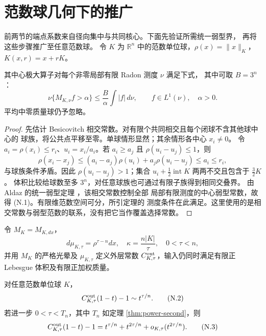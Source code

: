 \section{范数球几何下的推广}\label{sec:norm-geometry}
前两节的端点系数来自径向集中与共同核心。下面先验证所需统一弱型界，
再将这些步骤推广至任意范数球。
令 $K$ 为 $\mathbb R^n$ 中的范数单位球，$\rho(x)=\|x\|_K$，
$K(x,r)=x+rK$。
\begin{lemma}\label{lem:norm-weak}
其中心极大算子对每个非零局部有限 Radon 测度 $\nu$ 满足下式，
其中可取 $B=3^n$：
\[\nu\{M_{K,\nu}f>\alpha\}\le\frac B\alpha\int|f|\,d\nu,
\qquad f\in L^1(\nu),\quad\alpha>0.\tag{N.1}\]
平均中零质量球仍予忽略。
\end{lemma}
\begin{proof}
先估计 Besicovitch 相交常数。对有限个共同相交且每个闭球不含其他球中心的
球族，将公共点平移至零。单球情形显然；其余情形各中心 $x_i\ne0$。
令 $a_i=\rho(x_i)\le r_i$、$u_i=x_i/a_i$。若 $a_i\ge a_j$ 且
$\rho(u_i-u_j)\le1$，则
\[\rho(x_i-x_j)\le(a_i-a_j)\rho(u_i)+a_j\rho(u_i-u_j)\le a_i\le r_i,\]
与球族条件矛盾。因此 $\rho(u_i-u_j)>1$；集合
$u_i+\frac12\operatorname{int}K$ 两两不交且包含于 $\frac32K$。
体积比较给球数至多 $3^n$，对任意球族也可通过有限子族得到相同交叠界。
由 Aldaz 的统一弱型定理 \cite[Theorem 1.2]{Aldaz2020}，该相交常数控制全部
局部有限测度的中心弱型常数，故得 (N.1)。有限维范数空间可分，所引定理的
测度条件在此满足。这里使用的是相交常数与弱型范数的联系，没有把它当作覆盖选择常数。
\end{proof}
令 $M_K=M_{K,dx}$，
\[d\mu_{K,\tau}=\rho^{\tau-n}dx,\quad
\kappa=\frac{n|K|}{\tau},\quad 0<\tau<n,\]
并用 $M_K$ 的严格光晕及 $\mu_{K,\tau}$ 定义外层常数
$C^{\rm out}_{K,\tau}$，输入仍同时满足有限正 Lebesgue 体积及有限正加权质量。
\begin{theorem}\label{thm:norm-power}
对任意范数单位球 $K$，
\[C^{\rm out}_{K,\tau}(1-t)-1\sim t^{\tau/n}.\tag{N.2}\]
若进一步 $0<\tau<T_n$，其中 $T_n$ 如定理 \ref{thm:power-second}，则
\[C^{\rm out}_{K,\tau}(1-t)-1
=t^{\tau/n}+t^{2\tau/n}+o_{K,\tau}(t^{2\tau/n}).\tag{N.3}\]
\end{theorem}
